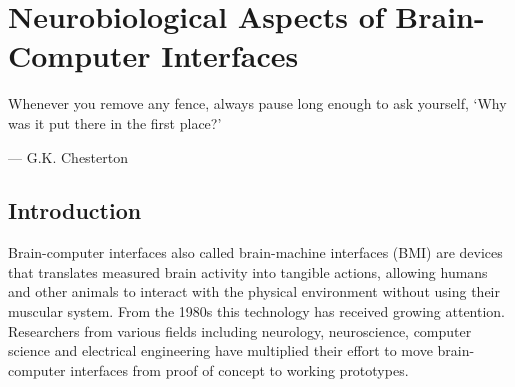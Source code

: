 
\chapter{Neurobiological Aspects of  Brain-Computer Interfaces }%
\label{chap:lit_survey_neuro}
\epigraph{Whenever you remove any fence, always pause long enough to ask yourself, `Why was it put there in the first place?'}{--- \textup{ G.K. Chesterton}}

\section{Introduction}%
\label{sec: bci_tech_intro}
Brain-computer interfaces also called brain-machine interfaces (BMI) are devices that translates measured brain activity into tangible actions, allowing humans and other animals to interact with the physical environment without using their muscular system.
From the 1980s this technology has received growing attention. 
Researchers from various fields including neurology, neuroscience, computer science and electrical engineering have multiplied their effort to move brain-computer interfaces from proof of concept to working prototypes.

